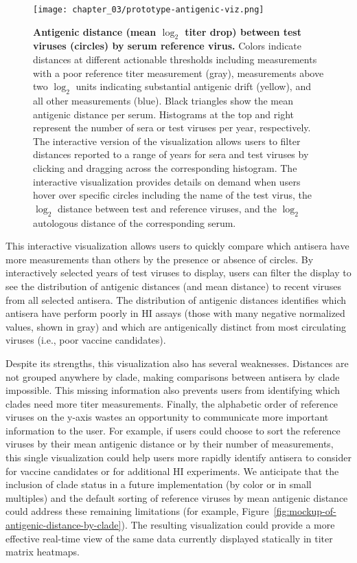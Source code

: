 \begin{figure}
  \centering
  \texttt{[image: chapter\_03/prototype-antigenic-viz.png]}
  \caption[{Antigenic distance (mean $\log_{2}$ titer drop) between test viruses (circles) by serum reference virus.}]{\label{fig:prototype-antigenic-viz} {\bf Antigenic distance (mean $\log_{2}$ titer drop) between test viruses (circles) by serum reference virus.}
    Colors indicate distances at different actionable thresholds including measurements with a poor reference titer measurement (gray), measurements above two $\log_{2}$ units indicating substantial antigenic drift (yellow), and all other measurements (blue).
    Black triangles show the mean antigenic distance per serum.
    Histograms at the top and right represent the number of sera or test viruses per year, respectively.
    The interactive version of the visualization allows users to filter distances reported to a range of years for sera and test viruses by clicking and dragging across the corresponding histogram.
    The interactive visualization provides details on demand when users hover over specific circles including the name of the test virus, the $\log_{2}$ distance between test and reference viruses, and the $\log_{2}$ autologous distance of the corresponding serum.
  }
\end{figure}

This interactive visualization allows users to quickly compare which antisera have more measurements than others by the presence or absence of circles.
By interactively selected years of test viruses to display, users can filter the display to see the distribution of antigenic distances (and mean distance) to recent viruses from all selected antisera.
The distribution of antigenic distances identifies which antisera have perform poorly in HI assays (those with many negative normalized values, shown in gray) and which are antigenically distinct from most circulating viruses (i.e., poor vaccine candidates).

Despite its strengths, this visualization also has several weaknesses.
Distances are not grouped anywhere by clade, making comparisons between antisera by clade impossible.
This missing information also prevents users from identifying which clades need more titer measurements.
Finally, the alphabetic order of reference viruses on the y-axis wastes an opportunity to communicate more important information to the user.
For example, if users could choose to sort the reference viruses by their mean antigenic distance or by their number of measurements, this single visualization could help users more rapidly identify antisera to consider for vaccine candidates or for additional HI experiments.
We anticipate that the inclusion of clade status in a future implementation (by color or in small multiples) and the default sorting of reference viruses by mean antigenic distance could address these remaining limitations (for example, Figure~\ref{fig:mockup-of-antigenic-distance-by-clade}).
The resulting visualization could provide a more effective real-time view of the same data currently displayed statically in titer matrix heatmaps.

